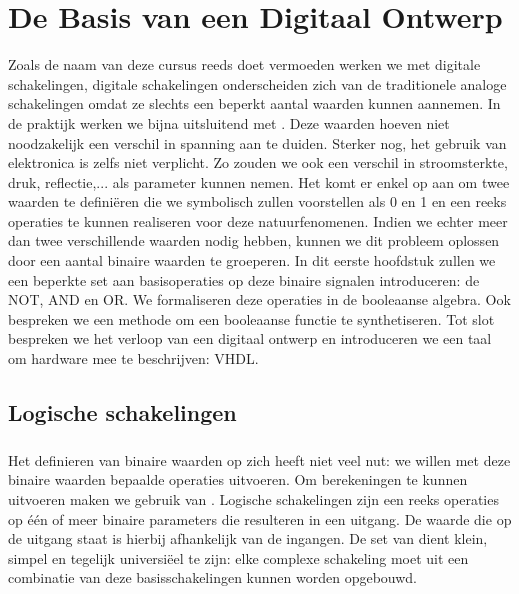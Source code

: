 \chapter{De Basis van een Digitaal Ontwerp}
\begin{chapterintro}
Zoals de naam van deze cursus reeds doet vermoeden werken we met digitale schakelingen, digitale schakelingen onderscheiden zich van de traditionele analoge schakelingen omdat ze slechts een beperkt aantal waarden kunnen aannemen. In de praktijk werken we bijna uitsluitend met . Deze waarden hoeven niet noodzakelijk een verschil in spanning aan te duiden. Sterker nog, het gebruik van elektronica is zelfs niet verplicht. Zo zouden we ook een verschil in stroomsterkte, druk, reflectie,... als parameter kunnen nemen. Het komt er enkel op aan om twee waarden te defini\"eren die we symbolisch zullen voorstellen als 0 en 1 en een reeks operaties te kunnen realiseren voor deze natuurfenomenen. Indien we echter meer dan twee verschillende waarden nodig hebben, kunnen we dit probleem oplossen door een aantal binaire waarden te groeperen. In dit eerste hoofdstuk zullen we een beperkte set aan basisoperaties op deze binaire signalen introduceren: de NOT, AND en OR. We formaliseren deze operaties in de booleaanse algebra. Ook bespreken we een methode om een booleaanse functie te synthetiseren. Tot slot bespreken we het verloop van een digitaal ontwerp en introduceren we een taal om hardware mee te beschrijven: VHDL.
\end{chapterintro}
\minitoc[n]
\section{Logische schakelingen}
\paragraph{}
Het definieren van binaire waarden op zich heeft niet veel nut: we willen met deze binaire waarden bepaalde operaties uitvoeren. Om berekeningen te kunnen uitvoeren maken we gebruik van . Logische schakelingen zijn een reeks operaties op \'e\'en of meer binaire parameters die resulteren in een uitgang. De waarde die op de uitgang staat is hierbij afhankelijk van de ingangen. De set van  dient klein, simpel en tegelijk universi\"eel te zijn: elke complexe schakeling moet uit een combinatie van deze basisschakelingen kunnen worden opgebouwd.
